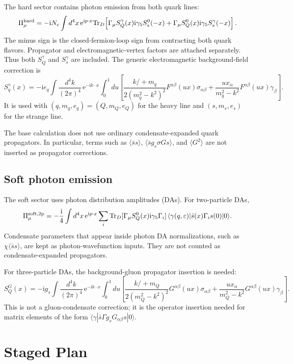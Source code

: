 \documentclass[11pt]{article}
\newcommand{\ii}{\mathrm{i}}
\newcommand{\ee}{\mathrm{e}}
\newcommand{\Tr}{\mathrm{Tr}}
\newcommand{\slashp}[1]{#1\!\!\!/}
\begin{document}
The hard sector contains photon emission from both quark lines:
\[
  \Pi_\mu^{\rm hard}
  =
  -\ii N_c\int d^4x\,\ee^{\ii p\cdot x}
  \Tr_D\!\left[
    \Gamma_\mu S_Q^\gamma(x)\ii\gamma_5S_s^0(-x)
    +
    \Gamma_\mu S_Q^0(x)\ii\gamma_5S_s^\gamma(-x)
  \right].
\]
The minus sign is the closed-fermion-loop sign from contracting both quark
flavors.  Propagator and electromagnetic-vertex factors are attached
separately.
Thus both $S_Q^\gamma$ and $S_s^\gamma$ are included.  The generic
electromagnetic background-field correction is
\[
  S_q^\gamma(x)
  =
  -\ii e_q
  \int\frac{d^4k}{(2\pi)^4}\,\ee^{-\ii k\cdot x}
  \int_0^1du
  \left[
    \frac{\slashp{k}+m_q}{2(m_q^2-k^2)^2}
    F^{\alpha\beta}(ux)\sigma_{\alpha\beta}
    +
    \frac{u x_\alpha}{m_q^2-k^2}
    F^{\alpha\beta}(ux)\gamma_\beta
  \right].
\]
It is used with $(q,m_q,e_q)=(Q,m_Q,e_Q)$ for the heavy line and
$(s,m_s,e_s)$ for the strange line.

The base calculation does not use ordinary condensate-expanded quark
propagators.  In particular, terms such as
$\langle\bar s s\rangle$, $\langle\bar s g_s\sigma Gs\rangle$, and
$\langle G^2\rangle$ are not inserted as propagator corrections.

\subsection{Soft photon emission}

The soft sector uses photon distribution amplitudes (DAs).  For two-particle
DAs,
\[
  \Pi_\mu^{\rm soft,2p}
  =
  -\frac{\ii}{4}\int d^4x\,\ee^{\ii p\cdot x}
  \sum_i
  \Tr_D[\Gamma_\mu S_Q^0(x)\ii\gamma_5\Gamma_i]\,
  \langle\gamma(q,\varepsilon)|
  \bar s(x)\Gamma_i s(0)
  |0\rangle .
\]
Condensate parameters that appear inside photon DA normalizations, such as
$\chi\langle\bar s s\rangle$, are kept as photon-wavefunction inputs.  They are
not counted as condensate-expanded propagators.

For three-particle DAs, the background-gluon propagator insertion is needed:
\[
  S_Q^G(x)
  =
  -\ii g_s
  \int\frac{d^4k}{(2\pi)^4}\,\ee^{-\ii k\cdot x}
  \int_0^1du
  \left[
    \frac{\slashp{k}+m_Q}{2(m_Q^2-k^2)^2}
    G^{\alpha\beta}(ux)\sigma_{\alpha\beta}
    +
    \frac{u x_\alpha}{m_Q^2-k^2}
    G^{\alpha\beta}(ux)\gamma_\beta
  \right].
\]
This is not a gluon-condensate correction; it is the operator insertion needed
for matrix elements of the form
$\langle\gamma|\bar s\Gamma g_sG_{\alpha\beta}s|0\rangle$.

\section{Staged Plan}
\end{document}
